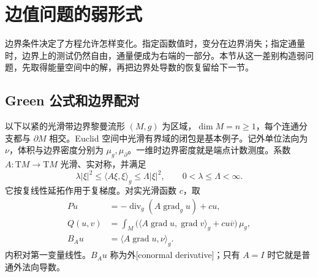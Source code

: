 
% 
% 

\section{边值问题的弱形式}
\label{g3:sec:1401}

边界条件决定了方程允许怎样变化。指定函数值时，变分在边界消失；指定通量时，边界上的测试仍然自由，通量便成为右端的一部分。本节从这一差别构造弱问题，先取得能量空间中的解，再把边界处导数的恢复留给下一节。

\subsection{Green 公式和边界配对}
\label{g3:subsec:1401:01}
以下以紧的光滑带边界黎曼流形 \((M,g)\) 为区域，\(\dim M=n\ge1\)，每个连通分支都与 \(\partial M\) 相交。Euclid 空间中光滑有界域的闭包是基本例子。记外单位法向为 \(\nu\)，体积与边界密度分别为 \(\mu_g,\mu_{\partial}\)。一维时边界密度就是端点计数测度。系数 \(A:\mathrm TM\to\mathrm TM\) 光滑、实对称，并满足
\[
	\lambda|\xi|^2\le\langle A\xi,\xi\rangle_g\le\Lambda|\xi|^2,
	\qquad0<\lambda\le\Lambda<\infty.
\]
它按复线性延拓作用于复梯度。对实光滑函数 \(c\)，取
\begin{equation}\label{g3:eq:boundary-operator-form}
	\begin{aligned}
		Pu&=-\operatorname{div}_g(A\operatorname{grad}_g u)+cu,\\
		Q(u,v)&=\int_M\bigl(\langle A\operatorname{grad}u,\operatorname{grad}v\rangle_g
		+cu\overline v\bigr)\,\mu_g,\\
		B_Au&=\langle A\operatorname{grad}u,\nu\rangle_g.
	\end{aligned}
\end{equation}
内积对第一变量线性。\(B_Au\) 称为外[conormal derivative]；只有 \(A=I\) 时它就是普通外法向导数。

